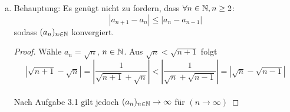 \documentclass{article}
\begin{document}
\begin{enumerate}[(a)]
\begin{proof}
		\begin{comment}
		Definiere nun $ m \coloneqq n+l $ und $ z \coloneqq n + k\  (n\in\N)$\\
		
		Sei $ \varepsilon > 0 $. Wähle $n_{\varepsilon} = \lceil \log_q\left(\frac{(1-q)\varepsilon}{|a_0-a_1|}\right)\rceil$
		Dann gilt $\forall n\in\N, n>n_\varepsilon$:
		\begin{align*}
		|a_z -a_m| &\leq  \left(\sum_{i =0}^kq^{i}\right) |a_{z-k} - a_{z-k-1}|\\&=\left(\frac{1-q^{n+1}}{{1-q}}\right)|a_n-a_{n-1}|\\&< \left(\frac{1}{1-q}\right)|a_n-a_{n-1}|\\&\leq\left(\frac{1}{1-q}\right)q^n|a_1-a_0|\\&<\left(\frac{1}{1-q}\right)q^{n_\varepsilon}|a_1-a_0|=\varepsilon
		\end{align*}
		\end{comment}
		Sei $ \varepsilon > 0 $. Wähle $n_{\varepsilon} = \lceil \log_q\left(\frac{(1-q)\varepsilon}{|a_0-a_1|}\right)\rceil$
		Dann gilt $\forall n, m\in\N, n, m>n_\varepsilon$, o.B.d.A. $n > m$:
		\begin{align*}
		|a_n -a_m| &= |a_{n_\epsilon + k} - a_{n_\epsilon + l}| = |a_{n_\epsilon + l + k-l} - a_{n_\epsilon + l}|\\
		&\leq  \left(\sum_{i =0}^{k-l}q^{i}\right) |a_{n_\epsilon + l} - a_{n_\epsilon + l -1}|\\
		&=\left(\frac{1-q^{k-l}}{{1-q}}\right)|a_{n_\epsilon + l} - a_{n_\epsilon + l -1}|\\
		&<\left(\frac{1}{1-q}\right)|a_{n_\epsilon + l} - a_{n_\epsilon + l -1}|\\
		&\leq\left(\frac{1}{1-q}\right)q^{n_\epsilon + l -1}|a_1-a_0|\\
		&\leq\left(\frac{1}{1-q}\right)q^{n_\varepsilon}|a_1-a_0|=\varepsilon
		\end{align*}
		
	\end{proof}
	\item Behauptung: Es genügt nicht zu fordern, dass $\forall n\in\mathbb{N}, n\geq 2$:
	$$ |a_{n+1}-a_n|\leq |a_n-a_{n-1}|$$ sodass $(a_n)_{n\in\mathbb{N}} $ konvergiert.
	
	\begin{proof}
		Wähle $a_n = \sqrt{n}$, $ n\in\mathbb{N}$. Aus $\sqrt{n}<\sqrt{n+1} $ folgt $$ |\sqrt{n+1}-\sqrt{n}| =\left|\frac{1}{\sqrt{n+1}+\sqrt{n}}\right|<\left|\frac{1}{\sqrt{n}+\sqrt{n-1}}\right|=|\sqrt{n}-\sqrt{n-1}|$$\\
		Nach Aufgabe 3.1 gilt jedoch $(a_n)_{n\in\mathbb{N}} \to \infty $ für $(n \to \infty)$
		
	\end{proof}
\end{enumerate}
\end{document}
